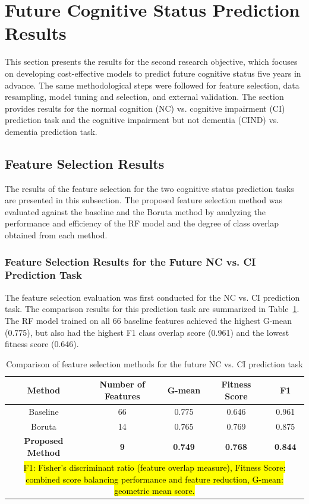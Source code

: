 \section{Future Cognitive Status Prediction Results}
This section presents the results for the second research objective, which focuses on developing cost-effective models to predict future cognitive status five years in advance. The same methodological steps were followed for feature selection, data resampling, model tuning and selection, and external validation. The section provides results for the normal cognition (NC) vs. cognitive impairment (CI) prediction task and the cognitive impairment but not dementia (CIND) vs. dementia prediction task.

\subsection{Feature Selection Results}
The results of the feature selection for the two cognitive status prediction tasks are presented in this subsection. The proposed feature selection method was evaluated against the baseline and the Boruta method by analyzing the performance and efficiency of the RF model and the degree of class overlap obtained from each method.

\subsubsection{Feature Selection Results for the Future NC vs. CI Prediction Task}

The feature selection evaluation was first conducted for the NC vs. CI prediction task. The comparison results for this prediction task are summarized in Table~\ref{table:fs-task3}. The RF model trained on all 66 baseline features achieved the highest G-mean (0.775), but also had the highest F1 class overlap score (0.961) and the lowest fitness score (0.646).

\begin{table}[!ht]
    \centering
    \caption{Comparison of feature selection methods for the future NC vs. CI prediction task}
    \begin{tabular}{|c|c|c|c|c|}
    \hline
        Method & Number of Features & G-mean & Fitness Score & F1 \\ \hline
        Baseline & 66 & 0.775 & 0.646 & 0.961 \\ \hline
        Boruta & 14 & 0.765 & 0.769 & 0.875 \\ \hline
        \textbf{Proposed Method} & \textbf{9} & \textbf{0.749} & \textbf{0.768} & \textbf{0.844} \\ \hline
        \multicolumn{5}{p{400pt}}{\footnotesize \hl{F1: Fisher's discriminant ratio (feature overlap measure), Fitness Score: combined score balancing performance and feature reduction, G-mean: geometric mean score.}}
    \end{tabular}
    \label{table:fs-task3}
\end{table}

